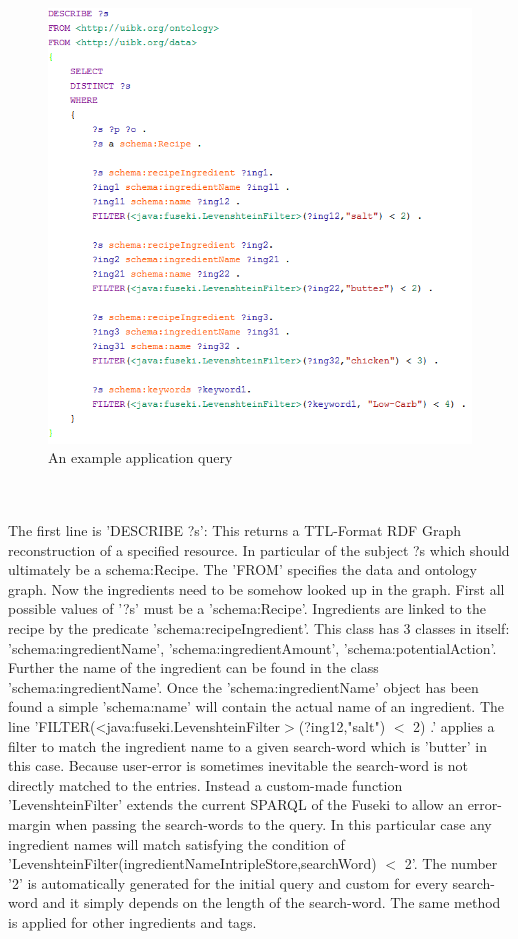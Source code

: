 \documentclass{article}
\begin{document}
\begin{figure}[H]
  \centering
  \includegraphics[width=12cm]{pictures/app_query.png}
  \caption{An example application query}
  \label{fig:app_q}
\end{figure}
\noindent
\\ \\
The first line is 'DESCRIBE ?s': This returns a TTL-Format RDF Graph reconstruction of a specified resource. In particular of the subject ?s which should ultimately be a schema:Recipe. The 'FROM' specifies the data and ontology graph. Now the ingredients need to be somehow looked up in the graph. First all possible values of '?s' must be a 'schema:Recipe'. Ingredients are linked to the recipe by the predicate 'schema:recipeIngredient'. This class has 3 classes in itself: 'schema:ingredientName', 'schema:ingredientAmount', 'schema:potentialAction'. Further the name of the ingredient can be found in the class 'schema:ingredientName'. Once the 'schema:ingredientName' object has been found a simple 'schema:name' will contain the actual name of an ingredient. The line 'FILTER(<java:fuseki.LevenshteinFilter$>$(?ing12,"salt") $<$ 2) .' applies a filter to match the ingredient name to a given search-word which is 'butter' in this case. Because user-error is sometimes inevitable the search-word is not directly matched to the entries. Instead a custom-made function 'LevenshteinFilter' extends the current SPARQL of the Fuseki to allow an error-margin when passing the search-words to the query. In this particular case any ingredient names will match satisfying the condition of 'LevenshteinFilter(ingredientNameIntripleStore,searchWord) $<$ 2'. The number '2' is automatically generated for the initial query and custom for every search-word and it simply depends on the length of the search-word. The same method is applied for other ingredients and tags.
\end{document}
